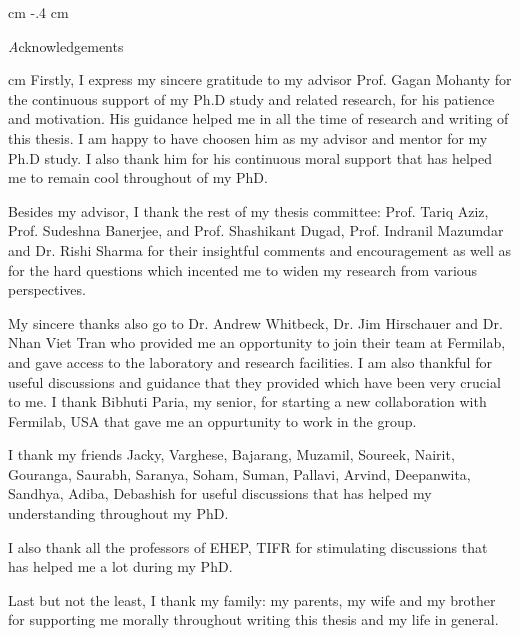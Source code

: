  cm 
\evensidemargin -.4 cm
\setlength{\textwidth}{152.4 mm}
\begin{center}
{\Large  \textsl Acknowledgements}
\end{center}
 cm
Firstly, I express my sincere gratitude to my advisor Prof. Gagan Mohanty for the continuous support of my Ph.D study and related research, for his patience and motivation. His guidance helped me in all the time of research and writing of this thesis. I am happy to have choosen him as my advisor and mentor for my Ph.D study. I also thank him for his continuous moral support that has helped me to remain cool throughout of my PhD. 
 

Besides my advisor, I thank the rest of my thesis committee: Prof. Tariq Aziz, Prof. Sudeshna Banerjee, and Prof. Shashikant Dugad,  Prof. Indranil Mazumdar and Dr. Rishi Sharma for their insightful comments and encouragement as well as for the hard questions which incented me to widen my research from various perspectives.

 

My sincere thanks also go to Dr. Andrew Whitbeck, Dr. Jim Hirschauer and  Dr. Nhan Viet Tran who provided me an opportunity to join their team  at Fermilab, and  gave access to the laboratory and research facilities. I am also thankful for useful discussions and guidance that they provided which have been very crucial to me. I  thank Bibhuti Paria, my senior, for starting a new collaboration with Fermilab, USA  that gave me an oppurtunity to work in  the group. 


I  thank my friends Jacky, Varghese, Bajarang, Muzamil, Soureek, Nairit, Gouranga, Saurabh, Saranya, Soham, Suman, Pallavi, Arvind, Deepanwita, Sandhya, Adiba, Debashish for useful discussions that has helped my understanding throughout my PhD. 

I also thank all the professors of EHEP, TIFR for stimulating discussions that has helped me a lot during my PhD. 

 

Last but not the least, I thank my family: my parents, my wife and my brother  for supporting me morally  throughout writing this thesis and my life in general. 









\clearpage


